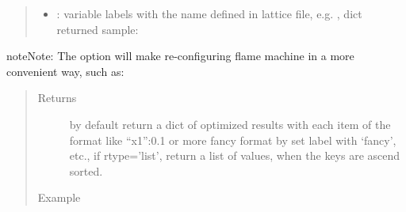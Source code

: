 \documentclass[letterpaper,10pt,english]{sphinxmanual}
\begin{document}
\begin{fulllineitems}
\begin{fulllineitems}
\begin{quote}
\begin{description}
\begin{itemize}
\begin{itemize}
\item {} 
: variable labels with the name defined in lattice file,
e.g. , dict returned sample: 

\end{itemize}


\end{itemize}

\end{description}\end{quote}

\begin{sphinxadmonition}{note}{Note:}
The  option will make re-configuring flame machine in a more 
convenient way, such as:

\begin{sphinxVerbatim}[commandchars=\\\{\},formatcom=\scriptsize]
  
   
    \PYG{p}{[}\PYG{p}{]} \PYG{p}{[}\PYG{p}{]}
\end{sphinxVerbatim}
\end{sphinxadmonition}
\begin{quote}\begin{description}
\item[{Returns}] \leavevmode
by default return a dict of optimized results with each item
of the format like ``x1'':0.1 or more fancy format by set label with `fancy', etc.,
if rtype='list', return a list of values, when the keys are ascend sorted.

\item[{Example}] \leavevmode
\end{description}\end{quote}


\end{fulllineitems}
\end{fulllineitems}
\end{document}

